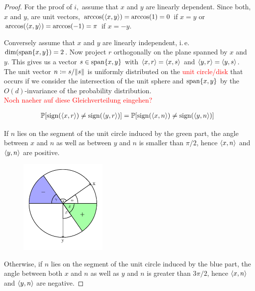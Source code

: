 \begin{proof}
	For the proof of $i,$ assume that $x$ and $y$ are linearly dependent. Since both, $x$ and $y$, are unit vectors, $\arccos(\langle{x},{y}\rangle) = \arccos(1)=0$ if $x=y$ or $\arccos(\langle{x},{y}\rangle) = \arccos(-1) = \pi$ if $x=-y$.
	
	Conversely assume that $x$ and $y$ are linearly independent, i.\,e. $\operatorname{dim}(\operatorname{span}\{x,y\})=2$. Now project $r$ orthogonally on the plane spanned by $x$ and $y$. This gives us a vector $s\in \operatorname{span}\{x,y\}$ with $\langle{x},{r}\rangle = \langle{x},{s}\rangle$ and $\langle{y},{r}\rangle = \langle{y},{s}\rangle$. The unit vector $n\coloneqq s/ \Vert {s} \Vert$ is uniformly distributed on the \textcolor{red}{unit circle/disk} that occurs if we consider the intersection of the unit sphere and $\operatorname{span}\{x,y\}$ by the $O(d)$-invariance of the probability distribution. \\
	
	\textcolor{red}{Noch naeher auf diese Gleichverteilung eingehen?}
	
	\begin{align*}
		\mathbb{P}[\operatorname{sign}(\langle{x},{r}\rangle)\neq\operatorname{sign}(\langle{y},{r}\rangle)]= \mathbb{P}[\operatorname{sign}(\langle{x},{n}\rangle)\neq\operatorname{sign}(\langle{y},{n}\rangle)] 
	\end{align*} 
	
	\noindent\begin{minipage}{\textwidth}	
		If $n$ lies on the segment of the unit circle induced by the green part, the angle between $x$ and $n$ as well as between $y$ and $n$ is smaller than $\pi/2$, hence $\langle{x},{n}\rangle$ and $\langle{y},{n}\rangle$ are positive. 
		\begin{figure}
			\vspace{-20pt}
			\begin{center}
				\includegraphics[width=0.38\textwidth]{chapters/fig_unit_circle.pdf}
			\end{center}
			\vspace{-20pt}
		\end{figure}
		Otherwise, if $n$ lies on the segment of the unit circle induced by the blue part, the angle between both $x$ and $n$ as well as $y$ and $n$ is greater than $3\pi/2$, hence $\langle{x},{n}\rangle$ and $\langle{y},{n}\rangle$ are negative.
		

\end{minipage}
\end{proof}
